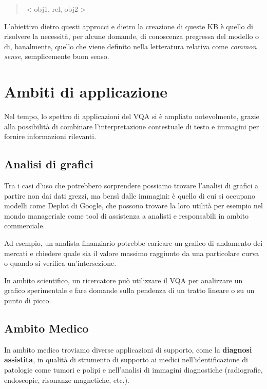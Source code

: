 \documentclass[../main.tex]{subfiles}
\begin{document}
\begin{quote}
    $<$obj1, rel, obj2$>$
\end{quote}

L'obiettivo dietro questi approcci e dietro la creazione di queste KB è quello di risolvere la necessità, per alcune domande, di conoscenza pregressa del modello o di, banalmente, quello che viene definito nella letteratura relativa come \textit{common sense}, semplicemente buon senso.

\section{Ambiti di applicazione}

Nel tempo, lo spettro di applicazioni del VQA si è ampliato notevolmente, grazie alla possibilità di combinare l'interpretazione contestuale di testo e immagini per fornire informazioni rilevanti.

\subsection{Analisi di grafici}

Tra i casi d'uso che potrebbero sorprendere possiamo trovare l'analisi di grafici a partire non dai dati grezzi, ma bensì dalle immagini: è quello di cui si occupano modelli come Deplot \cite{liu2022deplot} di Google, che possono trovare la loro utilità per esempio nel mondo manageriale come tool di assistenza a analisti e responsabili in ambito commerciale.

Ad esempio, un analista finanziario potrebbe caricare un grafico di andamento dei mercati e chiedere quale sia il valore massimo raggiunto da una particolare curva o quando si verifica un'intersezione.

In ambito scientifico, un ricercatore può utilizzare il VQA per analizzare un grafico sperimentale e fare domande sulla pendenza di un tratto lineare o su un punto di picco.

\subsection{Ambito Medico}

In ambito medico troviamo diverse applicazioni di supporto, come la \textbf{diagnosi assistita}, in qualità di strumento di supporto ai medici nell'identificazione di patologie come tumori e polipi e nell'analisi di immagini diagnostiche (radiografie, endoscopie, risonanze magnetiche, etc.).
\end{document}
